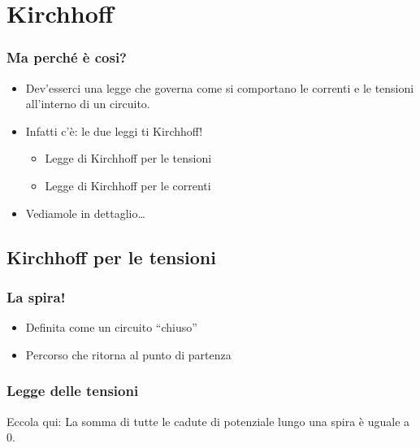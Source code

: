 \section{Kirchhoff}
\label{sec:kirchoff}
\begin{frame}
  \frametitle{Ma perché è cosi?}
  \begin{itemize}
    \item Dev'esserci una legge che governa come si comportano le correnti e le tensioni all'interno di un circuito.
    \item Infatti c'è: le due leggi ti Kirchhoff!
      \begin{itemize}
        \item Legge di Kirchhoff per le tensioni
        \item Legge di Kirchhoff per le correnti
      \end{itemize}
      \item Vediamole in dettaglio\ldots
  \end{itemize}
\end{frame}

\subsection{Kirchhoff per le tensioni}
\label{subsec:kirchhoff_per_le_tensioni}

\begin{frame}
  \frametitle{La spira!}
  \begin{itemize}
    \item Definita come un circuito ``chiuso''
    \item Percorso che ritorna al punto di partenza
  \end{itemize}
  \begin{figure}
    \centering
  \end{figure}
\end{frame}
\begin{frame}
  \frametitle{Legge delle tensioni}
  \begin{block}{Eccola qui:}
    La somma di tutte le cadute di potenziale lungo una spira è uguale a 0.
  \end{block}
  \begin{figure}
    \centering
  \end{figure}
\end{frame}

